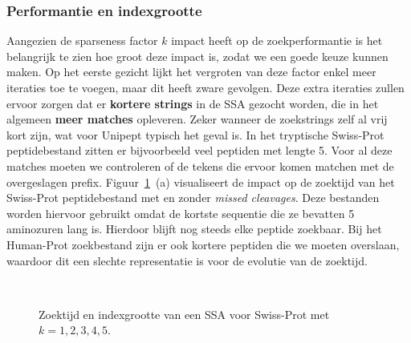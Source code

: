 \subsubsection{Performantie en indexgrootte}
Aangezien de sparseness factor $k$ impact heeft op de zoekperformantie is het belangrijk te zien hoe groot deze impact is, zodat we een goede keuze kunnen maken.
Op het eerste gezicht lijkt het vergroten van deze factor enkel meer iteraties toe te voegen, maar dit heeft zware gevolgen.
Deze extra iteraties zullen ervoor zorgen dat er \textbf{kortere strings} in de SSA gezocht worden, die in het algemeen \textbf{meer matches} opleveren.
Zeker wanneer de zoekstrings zelf al vrij kort zijn, wat voor Unipept typisch het geval is.
In het tryptische Swiss-Prot peptidebestand zitten er bijvoorbeeld veel peptiden met lengte 5.
Voor al deze matches moeten we controleren of de tekens die ervoor komen matchen met de overgeslagen prefix.
Figuur~\ref{fig:search_sparseness}~(a) visualiseert de impact op de zoektijd van het Swiss-Prot peptidebestand met en zonder \textit{missed cleavages}.
Deze bestanden worden hiervoor gebruikt omdat de kortste sequentie die ze bevatten 5 aminozuren lang is.
Hierdoor blijft nog steeds elke peptide zoekbaar.
Bij het Human-Prot zoekbestand zijn er ook kortere peptiden die we moeten overslaan, waardoor dit een slechte representatie is voor de evolutie van de zoektijd.
\\
\begin{figure}[H]
    \centering
    \\[4ex] %

    \caption{Zoektijd en indexgrootte van een SSA voor Swiss-Prot met $k = 1, 2, 3, 4, 5$.}\label{fig:search_sparseness}
\end{figure}

